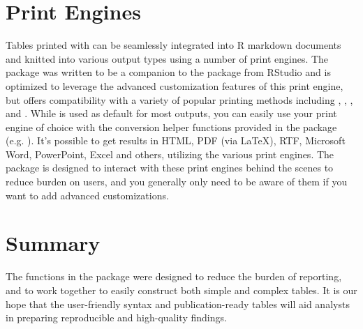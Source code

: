 \section{Print Engines}

Tables printed with  can be seamlessly integrated into R markdown documents and knitted into various output types using a number of print engines.
The package was written to be a companion to the  package from RStudio and is optimized to leverage the advanced customization features of this print engine, but offers compatibility with a variety of popular printing methods including  \citep{knitr},   \citep{flextable},  \citep{huxtable}, and  \citep{kableExtra}.
While  is used as default for most outputs, you can easily use your print engine of choice with the conversion helper functions provided in the package (e.g. ).
It's possible to get results in HTML, PDF (via \LaTeX), RTF, Microsoft Word, PowerPoint, Excel and others, utilizing the various print engines.
The package is designed to interact with these print engines behind the scenes to reduce burden on users, and you generally only need to be aware of them if you want to add advanced customizations.

\section{Summary}

The functions in the  package were designed to reduce the burden of reporting, and to work together to easily construct both simple and complex tables.
It is our hope that the user-friendly syntax and publication-ready tables will aid analysts in preparing reproducible and high-quality findings.



\address{Daniel D. Sjoberg\\
  Memorial Sloan Kettering Cancer Center\\
  1275 York Ave., New York, New York 10022\\
  USA\\
  ORCiD: 0000-0003-0862-2018\\
  }

\address{Karissa Whiting\\
  Memorial Sloan Kettering Cancer Center\\
  1275 York Ave., New York, New York 10022\\
  USA\\
  ORCiD: 0000-0002-4683-1868\\
  }

\address{Michael Curry\\
  Memorial Sloan Kettering Cancer Center\\
  1275 York Ave., New York, New York 10022\\
  USA\\
  ORCiD: 0000-0002-0261-4044\\
  }
